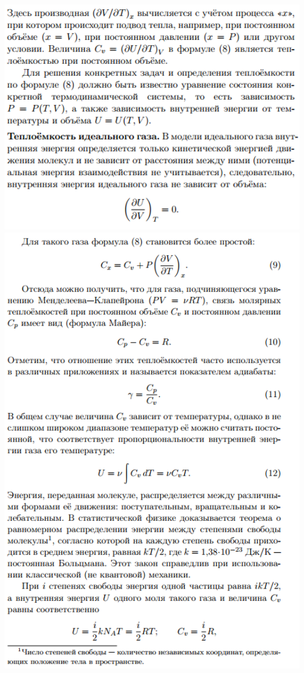 \documentclass[12pt]{article}
\begin{document}
    \begin{center}
    	\includegraphics[width=16cm]{theory_0.png}
    	\includegraphics[width=16cm]{theory_1.png}

\end{center}
\end{document}
